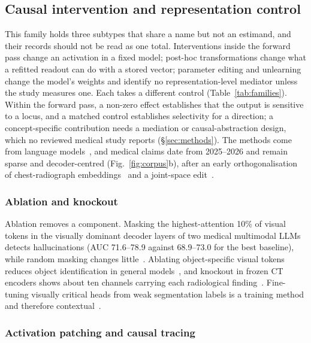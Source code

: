 \subsection{Causal intervention and representation control}
\label{sec:intervention}

This family holds three subtypes that share a name but not an estimand, and their records should not be
read as one total. Interventions inside the forward pass change an activation in a fixed model; post-hoc
transformations change what a refitted readout can do with a stored vector; parameter editing and
unlearning change the model's weights and identify no representation-level mediator unless the study
measures one. Each takes a different control (Table~\ref{tab:families}). Within the forward pass, a
non-zero effect establishes that the output is sensitive to a locus, and a matched control establishes
selectivity for a direction; a concept-specific contribution needs a mediation or causal-abstraction
design, which no reviewed medical study reports (\S\ref{sec:methods}). The methods come from language
models~\cite{vig2020causal,geiger2021causal,geiger2023causal,meng2022locating,meng2022mass,zhang2023towards,turner2023steering,rimsky2023steering,zou2023representation,li2023inference,arditi2024refusal},
and medical claims date from 2025--2026 and remain sparse and decoder-centred
(Fig.~\ref{fig:corpus}b), after an early orthogonalisation of chest-radiograph
embeddings~\cite{weber2023posthoc} and a joint-space edit~\cite{sadashivaiah2024explaining}.

\subsubsection{Ablation and knockout}

Ablation removes a component. Masking the highest-attention 10\% of visual tokens in the visually
dominant decoder layers of two medical multimodal LLMs detects hallucinations (AUC 71.6--78.9 against
68.9--73.0 for the best baseline), while random masking changes little~\cite{chen2026vihd}. Ablating
object-specific visual tokens reduces object identification in general models~\cite{neo2024towards}, and
knockout in frozen CT encoders shows about ten channels carrying each radiological
finding~\cite{nooralahzadeh2026sparse}. Fine-tuning visually critical heads from weak segmentation
labels is a training method and therefore contextual~\cite{chang2025focus}.

\subsubsection{Activation patching and causal tracing}

